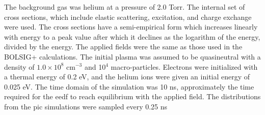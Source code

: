 The background gas was helium at a pressure of 2.0 Torr. The internal set of
cross sections, which include elastic scattering, excitation, and charge
exchange were used. The cross sections have a semi-empirical form which
increases linearly with energy to a peak value after which it declines as the
logarithm of the energy, divided by the energy. The applied fields were the same
as those used in the BOLSIG+ calculations. The initial plasma was assumed to be
quasineutral with a density of $1.0\times10^{8}$ cm$^{-3}$ and 10$^4$
macro-particles. Electrons were initialized with a thermal energy of 0.2 eV, and
the helium ions were given an initial energy of 0.025 eV. The time domain of the
simulation was 10 ns, approximately the time required for the \acs{eedf} to
reach equilibrium with the applied field. The distributions from the \acs{pic}
simulations were sampled every 0.25 ns 

